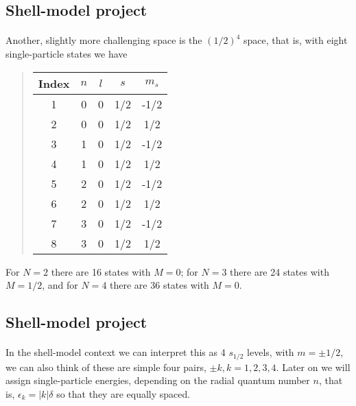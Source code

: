 \documentclass[%
oneside,                 %
final,                   %
10pt]{article}
\begin{document}
\subsection*{Shell-model project}

\paragraph{}
Another, slightly more challenging space is the $(1/2)^4$ space, that is, 
with eight  single-particle states we have


\begin{quote}
\begin{tabular}{ccccc}
\hline
\multicolumn{1}{c}{ Index } & \multicolumn{1}{c}{ $n$ } & \multicolumn{1}{c}{ $l$ } & \multicolumn{1}{c}{ $s$ } & \multicolumn{1}{c}{ $m_s$ } \\
\hline
1     & 0   & 0   & 1/2 & -1/2  \\
2     & 0   & 0   & 1/2 & 1/2   \\
3     & 1   & 0   & 1/2 & -1/2  \\
4     & 1   & 0   & 1/2 & 1/2   \\
5     & 2   & 0   & 1/2 & -1/2  \\
6     & 2   & 0   & 1/2 & 1/2   \\
7     & 3   & 0   & 1/2 & -1/2  \\
8     & 3   & 0   & 1/2 & 1/2   \\
\hline
\end{tabular}
\end{quote}

\noindent
For $N=2$ there are 16 states with $M=0$; for $N=3$ there are 24 states with $M=1/2$, and for 
$N=4$ there are 36 states with $M=0$.



\subsection*{Shell-model project}

\paragraph{}
In the shell-model context we can interpret this as 4 $s_{1/2}$ levels, with $m = \pm 1/2$, we can also think of these are simple four pairs,  $\pm k, k = 1,2,3,4$. Later on we will 
assign single-particle energies,  depending on the radial quantum number $n$, that is, 
$\epsilon_k = |k| \delta$ so that they are equally spaced.
\end{document}
